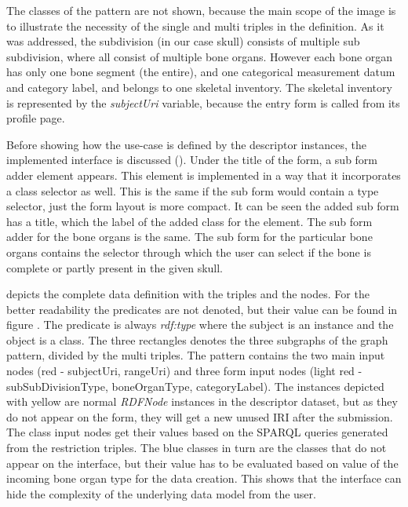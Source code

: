
The classes of the pattern are not shown, because the main scope of the image is to illustrate the necessity of the single and multi triples in the definition. As it was addressed, the subdivision (in our case skull) consists of multiple sub subdivision, where all consist of multiple bone organs. However each bone organ has only one bone segment (the entire), and one categorical measurement datum and category label, and belongs to one skeletal inventory. The skeletal inventory is represented by the \textit{subjectUri} variable, because the entry form is called from its profile page.

Before showing how the use-case is defined by the descriptor instances, the implemented interface is discussed (). Under the title of the form, a sub form adder element appears. This element is implemented in a way that it incorporates a class selector as well. This is the same if the sub form would contain a type selector, just the form layout is more compact. It can be seen the added sub form has a title, which the label of the added class for the element. The sub form adder for the bone organs is the same. The sub form for the particular bone organs contains the selector through which the user can select if the bone is complete or partly present in the given skull.


 depicts the complete data definition with the triples and the nodes. For the better readability the predicates are not denoted, but their value can be found in figure . The predicate is always \textit{rdf:type} where the subject is an instance and the object is a class. The three rectangles denotes the three subgraphs of the graph pattern, divided by the multi triples. The pattern contains the two main input nodes (red - subjectUri, rangeUri) and three form input nodes (light red - subSubDivisionType, boneOrganType, categoryLabel). The instances depicted with yellow are normal \textit{RDFNode} instances in the descriptor dataset, but as they do not appear on the form, they will get a new unused IRI after the submission. The class input nodes get their values based on the SPARQL queries generated from the restriction triples. The blue classes in turn are the classes that do not appear on the interface, but their value has to be evaluated based on value of the incoming bone organ type for the data creation. This shows that the interface can hide the complexity of the underlying data model from the user.

